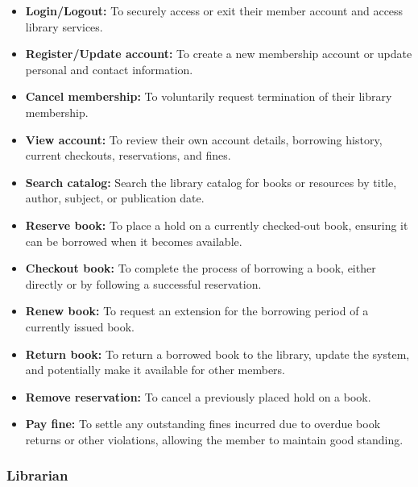 \begin{itemize}
\item
\protect{}\label{Yj2VSP5PW1aLRw9oVqfMn}
\textbf{Login/Logout:} To securely access or exit their member account and access library services.
\item
\protect{}\label{7JRYMEALF8zzrYk7yWJYE}
\textbf{Register/Update account:} To create a new membership account or update personal and contact information.
\item
\protect{}\label{04w6eGxteMWC9soKIKdbr}
\textbf{Cancel membership:} To voluntarily request termination of their library membership.
\item
\protect{}\label{GtB-K_UxQjr70fCu0wyvn}
\textbf{View account:} To review their own account details, borrowing history, current checkouts, reservations, and fines.
\item
\protect{}\label{hAA-jR3Y_4x_r5xDmFd8y}
\textbf{Search catalog:} Search the library catalog for books or resources by title, author, subject, or publication date.
\item
\protect{}\label{_r4p2PWbgay-RVK5m9a6a}
\textbf{Reserve book:} To place a hold on a currently checked-out book, ensuring it can be borrowed when it becomes available.
\item
\protect{}\label{OyWTiRFAu6rZsNPt667W0}
\textbf{Checkout book:} To complete the process of borrowing a book, either directly or by following a successful reservation.
\item
\protect{}\label{uUVinSWKSKx63Cs-XXS2z}
\textbf{Renew book:} To request an extension for the borrowing period of a currently issued book.
\item
\protect{}\label{cIUkq3O_k78-3ua0Lbaw7}
\textbf{Return book:} To return a borrowed book to the library, update the system, and potentially make it available for other members.
\item
\protect{}\label{Yw3IjE09-viL4nbrmlUMU}
\textbf{Remove reservation:} To cancel a previously placed hold on a book.
\item
\protect{}\label{Q0JRrLvGH-jlNvZ2klCWt}
\textbf{Pay fine:} To settle any outstanding fines incurred due to overdue book returns or other violations, allowing the member to maintain good standing.
\end{itemize}

\subsubsection{Librarian}\label{8mwX3gsZWSsW-gIvgCd-E}

